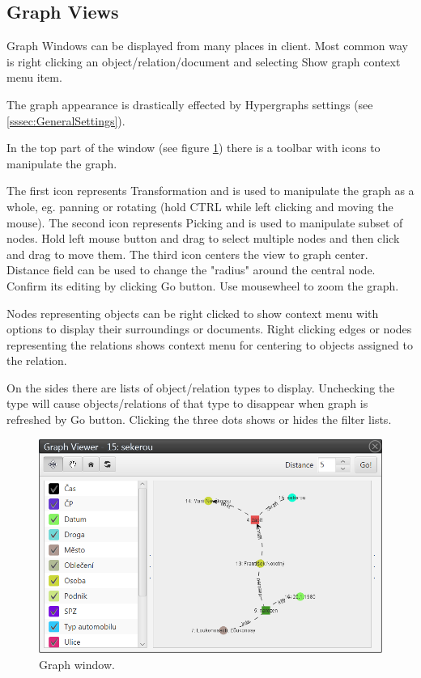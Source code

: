 \subsection{Graph Views}
\label{ssec:Graphs}

Graph Windows can be displayed from many places in \textan{} client. Most
common way is right clicking an object/relation/document and selecting Show
graph context menu item.

The graph appearance is drastically effected by Hypergraphs settings (see
\ref{sssec:GeneralSettings}).

In the top part of the window (see figure \ref{fig:Graph}) there is a toolbar
with icons to manipulate the graph.

The first icon represents Transformation and is used to manipulate the graph as a whole, eg. panning or rotating (hold CTRL while left clicking and moving the
mouse). The second icon represents Picking and is used to manipulate subset of
nodes. Hold left mouse button and drag to select multiple nodes and then click
and drag to move them. The third icon centers the view to graph center.
Distance field can be used to change the "radius" around the central node.
Confirm its editing by clicking Go button. Use mousewheel to zoom the graph.

Nodes representing objects can be right clicked to show context menu with
options to display their surroundings or documents. Right clicking edges or
nodes representing the relations shows context menu for centering to objects
assigned to the relation.

On the sides there are lists of object/relation types to display. Unchecking
the type will cause objects/relations of that type to disappear when graph is refreshed by Go button. Clicking the three dots shows or hides the filter
lists.

\begin{figure}[!htb]
        \centering
        \includegraphics[width=\textwidth]{Images/graph}
        \caption{Graph window.}
        \label{fig:Graph}
\end{figure}

